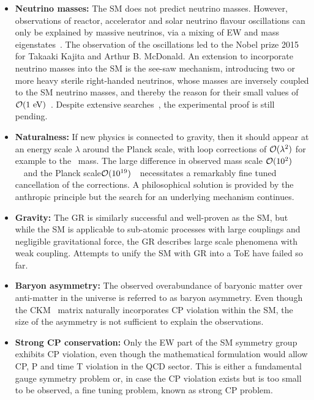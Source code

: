 \begin{itemize}
\item{{\bf Neutrino masses:}}
The \gls{SM} does not predict neutrino masses. However, observations of reactor, accelerator and solar neutrino flavour oscillations can only be explained by massive neutrinos, via a mixing of \gls{EW} and mass eigenstates~\cite{PhysRevLett.89.011301,PhysRevLett.81.1562}. The observation of the oscillations led to the Nobel prize 2015 for Takaaki Kajita and Arthur B. McDonald. An extension to incorporate neutrino masses into the \gls{SM} is the see-saw mechanism, introducing two or more heavy sterile right-handed neutrinos, whose masses are inversely coupled to the \gls{SM} neutrino masses, and thereby the reason for their small values of $\mathcal O(1~\mathrm{eV})$~\cite{PDG2014}. Despite extensive searches~\cite{ATLAS-CONF-2013-019}, the experimental proof is still pending.
\item{{\bf Naturalness:}}
If new physics is connected to gravity, then it should appear at an energy scale $\lambda$ around the Planck scale, with loop corrections of $\mathcal O(\lambda^2)$ for example to the \Hboson\ mass. The large difference in observed mass scale $\mathcal O(10^2)$~\GeV\ and the Planck scale\linebreak $\mathcal O(10^{19})$~\GeV\ necessitates a remarkably fine tuned cancellation of the corrections. A philosophical solution is provided by the anthropic principle but the search for an underlying mechanism continues.
\item{{\bf Gravity:}}
The \gls{GR} is similarly successful and well-proven as the \gls{SM}, but while the \gls{SM} is applicable to sub-atomic processes with large couplings and negligible gravitational force, the \gls{GR} describes large scale phenomena with weak coupling. Attempts to unify the \gls{SM} with \gls{GR} into a \gls{ToE} have failed so far.
\item{{\bf Baryon asymmetry:}}
The observed overabundance of baryonic matter over anti-matter in the universe is referred to as baryon asymmetry. Even though the \gls{CKM}~\cite{CKM1,CKM2} matrix naturally incorporates \gls{CP} violation within the \gls{SM}, the size of the asymmetry is not sufficient to explain the observations.
\item{{\bf Strong \gls{CP} conservation:}}
Only the \gls{EW} part of the \gls{SM} symmetry group exhibits \gls{CP} violation, even though the mathematical formulation would allow \gls{CP}, P and time T violation in the \gls{QCD} sector. This is either a fundamental gauge symmetry problem or, in case the \gls{CP} violation exists but is too small to be observed, a fine tuning problem, known as strong \gls{CP} problem.

\end{itemize}

